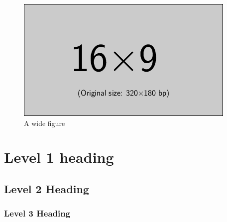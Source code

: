 \documentclass[bibtex,autowc]{apsr_submission}
\begin{document}
\begin{figure}
\centering
\caption{A wide figure}\label{fig:wide}
\includegraphics[width=\linewidth]{example-image-16x9}
\end{figure}

\section{Level 1 heading}

\lipsum[2]

\subsection{Level 2 Heading}

\lipsum[3]

\subsubsection{Level 3 Heading}

\lipsum[4]




\end{document}
